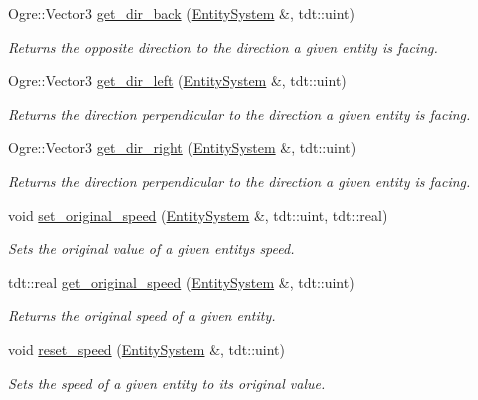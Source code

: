 \begin{DoxyCompactItemize}
Ogre\+::\+Vector3 \hyperlink{namespace_movement_helper_a09d364fb83957990a2210fd7f5ba1189}{get\+\_\+dir\+\_\+back} (\hyperlink{class_entity_system}{Entity\+System} \&, tdt\+::uint)
\begin{DoxyCompactList}\small\item\em Returns the opposite direction to the direction a given entity is facing. \end{DoxyCompactList}\item 
Ogre\+::\+Vector3 \hyperlink{namespace_movement_helper_a425937ac7ab27c2af1dcedde7c4ef9c5}{get\+\_\+dir\+\_\+left} (\hyperlink{class_entity_system}{Entity\+System} \&, tdt\+::uint)
\begin{DoxyCompactList}\small\item\em Returns the direction perpendicular to the direction a given entity is facing. \end{DoxyCompactList}\item 
Ogre\+::\+Vector3 \hyperlink{namespace_movement_helper_a7f2606d99ff65fa8492259e65ae55235}{get\+\_\+dir\+\_\+right} (\hyperlink{class_entity_system}{Entity\+System} \&, tdt\+::uint)
\begin{DoxyCompactList}\small\item\em Returns the direction perpendicular to the direction a given entity is facing. \end{DoxyCompactList}\item 
void \hyperlink{namespace_movement_helper_a5322a9ccdb02a4d9f60c2f100de0ff78}{set\+\_\+original\+\_\+speed} (\hyperlink{class_entity_system}{Entity\+System} \&, tdt\+::uint, tdt\+::real)
\begin{DoxyCompactList}\small\item\em Sets the original value of a given entity\textquotesingle{}s speed. \end{DoxyCompactList}\item 
tdt\+::real \hyperlink{namespace_movement_helper_a2a49d8de5516509bfa3bafebb8889b72}{get\+\_\+original\+\_\+speed} (\hyperlink{class_entity_system}{Entity\+System} \&, tdt\+::uint)
\begin{DoxyCompactList}\small\item\em Returns the original speed of a given entity. \end{DoxyCompactList}\item 
void \hyperlink{namespace_movement_helper_a197b8899790247c8e5c6cd15e635cbaf}{reset\+\_\+speed} (\hyperlink{class_entity_system}{Entity\+System} \&, tdt\+::uint)
\begin{DoxyCompactList}\small\item\em Sets the speed of a given entity to it\textquotesingle{}s original value. \end{DoxyCompactList}\end{DoxyCompactItemize}


